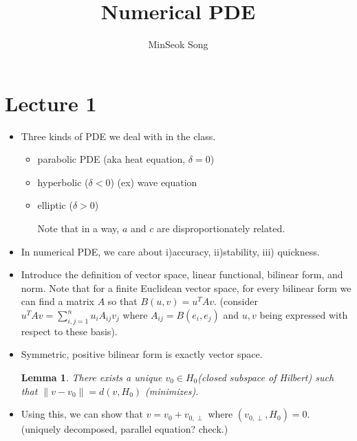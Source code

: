 \documentclass{article}
\title{Numerical PDE}
\author{MinSeok Song}
\date{}
\newtheorem{lemma}[theorem]{Lemma}
\theoremstyle{remark}
\begin{document}
\maketitle 
\section*{Lecture 1}
\begin{itemize}
\item Three kinds of PDE we deal with in the class.
\begin{itemize}
\item parabolic PDE (aka heat equation, $\delta=0$)
\item hyperbolic ($\delta<0$) (ex) wave equation
\item elliptic ($\delta>0$)

Note that in a way, $a$ and $c$ are disproportionately related.
\end{itemize}
\item In numerical PDE, we care about i)accuracy, ii)stability, iii) quickness.

\item Introduce the definition of vector space, linear functional, bilinear form, and norm. 
Note that for a finite Euclidean vector space, for every bilinear form we can find a matrix $A$ so that $B(u,v)=u^TAv$. (consider $u^TAv=\sum^n_{i,j=1}u_iA_{ij}v_j$ where $A_{ij}=B(e_i,e_j)$ and $u,v$ being expressed with respect to these basis).

\item Symmetric, positive bilinear form is exactly vector space.
\begin{lemma}
There exists a unique $v_0\in H_0$(closed subspace of Hilbert) such that $\lVert v-v_0\rVert=d(v,H_0)$ (minimizes).
\end{lemma}

\item Using this, we can show that $v=v_0+v_{0,\perp}$ where $(v_{0,\perp},H_0)=0$.
(uniquely decomposed, parallel equation? check.)

\end{itemize}
\end{document}
